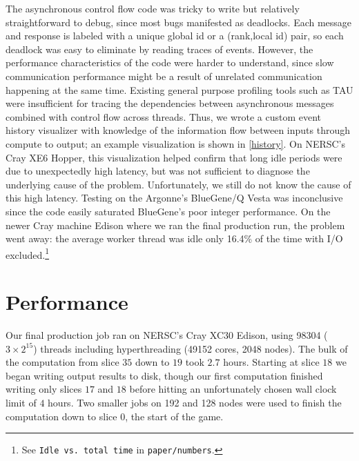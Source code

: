\documentclass[conference]{IEEEtran}
\begin{document}
The asynchronous control flow code was tricky to write but relatively straightforward to debug,
since most bugs manifested as deadlocks.  Each message and response is labeled with a unique global id or a
(rank,local id) pair, so each deadlock was easy to eliminate by reading traces of events.  However, the performance
characteristics of the code were harder to understand, since slow communication performance might be a result of
unrelated communication happening at the same time.  Existing general purpose profiling tools such as TAU
\cite{shende2006tau} were insufficient for tracing the dependencies between asynchronous messages
combined with control flow across threads.  Thus, we wrote a custom event history visualizer with
knowledge of the information flow between inputs through compute to output; an example visualization is
shown in \autoref{history}.  On NERSC's Cray XE6 Hopper, this visualization helped confirm that long idle periods
were due to unexpectedly high latency, but was not sufficient to diagnose the underlying cause of the problem.
Unfortunately, we still do not know the cause of this high latency.  Testing on the Argonne's BlueGene/Q Vesta
was inconclusive since the code easily saturated BlueGene's poor integer performance.  On the newer Cray machine
Edison where we ran the final production run, the problem went away: the average worker thread was idle only
16.4\% of the time with I/O excluded.\cprotect\footnote{See \verb+Idle vs. total time+ in
\verb+paper/numbers+\label{idle}.}

\section{Performance}

Our final production job ran on NERSC's Cray XC30 Edison, using 98304 ($3 \times 2^{15}$) threads
including hyperthreading (49152 cores, 2048 nodes).  The bulk of the computation from slice $35$ down
to $19$ took $2.7$ hours.  Starting at slice $18$ we began writing output results to disk, though our
first computation finished writing only slices $17$ and $18$ before hitting an unfortunately chosen
wall clock limit of $4$ hours.  Two smaller jobs on 192 and 128 nodes were used to finish the computation
down to slice $0$, the start of the game.
\end{document}
